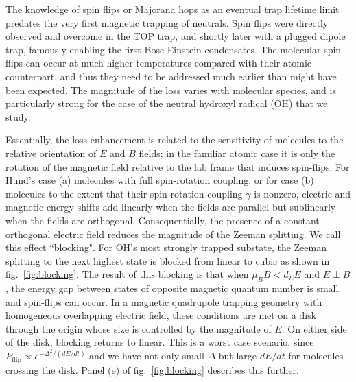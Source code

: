 \documentclass[%
 reprint,
 amsmath,amssymb,
 aps,
prl,
]{revtex4-1}
\begin{document}
The knowledge of spin flips or Majorana hops as an eventual trap lifetime limit predates the very first magnetic trapping of neutrals\cite{Migdall1985}. Spin flips were directly observed and overcome in the TOP trap\cite{Petrich1995}, and shortly later with a plugged dipole trap\cite{Davis1995}, famously enabling the first Bose-Einstein condensates. The molecular spin-flips can occur at much higher temperatures compared with their atomic counterpart, and thus they need to be addressed much earlier than might have been expected. The magnitude of the loss varies with molecular species, and is particularly strong for the case of the neutral hydroxyl radical (OH) that we study. 

Essentially, the loss enhancement is related to the sensitivity of molecules to the relative orientation of $E$ and $B$ fields;  in the familiar atomic case it is only the rotation of the magnetic field relative to the lab frame that induces spin-flips. For Hund's case (a) molecules with full spin-rotation coupling, or for case (b) molecules to the extent that their spin-rotation coupling $\gamma$ is nonzero, electric and magnetic energy shifts add linearly when the fields are parallel but sublinearly when the fields are orthogonal. Consequentially, the presence of a constant orthogonal electric field reduces the magnitude of the Zeeman splitting. We call this effect ``blocking". For OH's most strongly trapped substate, the Zeeman splitting to the next highest state is blocked from linear to cubic as shown in fig.~\ref{fig:blocking}.  The result of this blocking is that when $\mu_BB < d_EE$ and $E\!\perp\! B$, the energy gap between states of opposite magnetic quantum number is small, and spin-flips can occur. In a magnetic quadrupole trapping geometry with homogeneous overlapping electric field, these conditions are met on a disk through the origin whose size is controlled by the magnitude of $E$. On either side of the disk, blocking returns to linear. This is a worst case scenario, since $P_{\text{flip}}\propto e^{-\Delta^2/(dE/dt)}$ and we have not only small $\Delta$ but large $dE/dt$ for molecules crossing the disk. Panel (e) of fig.~\ref{fig:blocking} describes this further.
\end{document}
